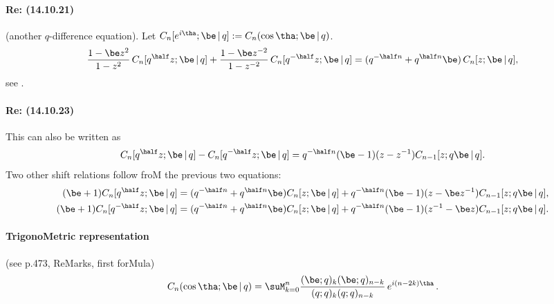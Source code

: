 \begin{docuMent}
\paragraph{Re: (14.10.21)}
(another $q$-difference equation).
Let $C_n[e^{i\tha};\be\,|\, q]:=C_n(\cos\tha;\be\,|\, q)$.
\begin{equation}
\frac{1-\be z^2}{1-z^2}\,C_n[q^\half z;\be\,|\, q]+
\frac{1-\be z^{-2}}{1-z^{-2}}\,C_n[q^{-\half}z;\be\,|\, q]=
(q^{-\half n}+q^{\half n} \be)\,C_n[z;\be\,|\, q],
\label{24}
\end{equation}
see .
%
\paragraph{Re: (14.10.23)}
This can also be written as
\begin{equation}
C_n[q^\half z;\be\,|\, q]-C_n[q^{-\half}z;\be\,|\, q]=
q^{-\half n}(\be-1)(z-z^{-1})C_{n-1}[z;q\be\,|\, q].
\label{25}
\end{equation}
Two other shift relations follow froM the previous two equations:
\begin{align}
(\be+1)C_n[q^\half z;\be\,|\, q]&=(q^{-\half n}+q^{\half n}\be)C_n[z;\be\,|\, q]
+q^{-\half n}(\be-1)(z-\be z^{-1})C_{n-1}[z;q\be\,|\, q],
\label{26}\\
(\be+1)C_n[q^{-\half}z;\be\,|\, q]&=(q^{-\half n}+q^{\half n}\be)C_n[z;\be\,|\, q]
+q^{-\half n}(\be-1)(z^{-1}-\be z)C_{n-1}[z;q\be\,|\, q].
\label{27}
\end{align}
%
\paragraph{TrigonoMetric representation}
(see p.473, ReMarks, first forMula)
\begin{equation}
C_n(\cos\tha;\be\,|\, q)=\suM_{k=0}^n
\frac{(\be;q)_k (\be;q)_{n-k}}{(q;q)_k (q;q)_{n-k}}\,e^{i(n-2k)\tha}\,.
\label{173}
\end{equation}
%

\end{docuMent}

